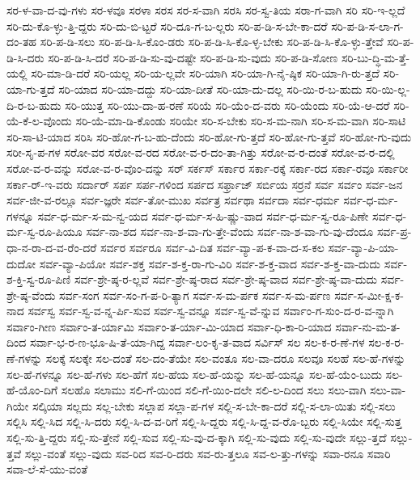 {ಸರ-ಳ-ವಾ-ದ-ವು-ಗಳು
ಸರ-ಳವೂ
ಸರಳಾ
ಸರಸ
ಸರ-ಸ-ವಾಗಿ
ಸರಸಿ
ಸರ-ಸ್ವ-ತಿಯ
ಸರಾ-ಗ-ವಾಗಿ
ಸರಿ
ಸರಿ-ಇ-ಲ್ಲದೆ
ಸರಿ-ದು-ಕೊ-ಳ್ಳು-ತ್ತಿ-ದ್ದರು
ಸರಿ-ದು-ಬಿ-ಟ್ಟರೆ
ಸರಿ-ದೂ-ಗ-ಬ-ಲ್ಲರು
ಸರಿ-ಪ-ಡಿ-ಸ-ಬೇ-ಕಾ-ದರೆ
ಸರಿ-ಪ-ಡಿ-ಸ-ಲಾ-ಗ-ದಂ-ತಹ
ಸರಿ-ಪ-ಡಿ-ಸಲು
ಸರಿ-ಪ-ಡಿ-ಸಿ-ಕೊಂ-ಡರು
ಸರಿ-ಪ-ಡಿ-ಸಿ-ಕೊ-ಳ್ಳ-ಬೇಕು
ಸರಿ-ಪ-ಡಿ-ಸಿ-ಕೊ-ಳ್ಳು-ತ್ತೇವೆ
ಸರಿ-ಪ-ಡಿ-ಸಿ-ದರು
ಸರಿ-ಪ-ಡಿ-ಸಿ-ದರೆ
ಸರಿ-ಪ-ಡಿ-ಸು-ವು-ದಷ್ಟೇ
ಸರಿ-ಪ-ಡಿ-ಸು-ವುದು
ಸರಿ-ಪ-ಡಿ-ಸೋಣ
ಸರಿ-ಬು-ದ್ಧಿ-ಮ-ತ್ತೆ-ಯಲ್ಲಿ
ಸರಿ-ಮಾ-ಡಿ-ದರೆ
ಸರಿ-ಯಲ್ಲ
ಸರಿ-ಯ-ಲ್ಲವೇ
ಸರಿ-ಯಾಗಿ
ಸರಿ-ಯಾ-ಗಿ-ನೈ-ಷ್ಠಿಕ
ಸರಿ-ಯಾ-ಗಿ-ರು-ತ್ತದೆ
ಸರಿ-ಯಾ-ಗು-ತ್ತದೆ
ಸರಿ-ಯಾದ
ಸರಿ-ಯಾ-ದದ್ದು
ಸರಿ-ಯಾ-ದೀತೆ
ಸರಿ-ಯಾ-ದು-ದಲ್ಲ
ಸರಿ-ಯಿ-ರ-ಬ-ಹುದು
ಸರಿ-ಯಿ-ಲ್ಲ-ದಿ-ರ-ಬ-ಹುದು
ಸರಿ-ಯುತ್ತ
ಸರಿ-ಯು-ದಾ-ಹ-ರಣೆ
ಸರಿಯೆ
ಸರಿ-ಯೆಂ-ದ-ವರು
ಸರಿ-ಯೆಂದು
ಸರಿ-ಯೆ-ಆ-ದರೆ
ಸರಿ-ಯೆ-ಕೆ-ಲ-ವೊಂದು
ಸರಿ-ಯೆ-ಮಾ-ಡಿ-ಕೊಂಡು
ಸರಿಯೇ
ಸರಿ-ಸ-ಬೇಕು
ಸರಿ-ಸ-ಮ-ನಾಗಿ
ಸರಿ-ಸ-ಮ-ವಾಗಿ
ಸರಿ-ಸಾಟಿ
ಸರಿ-ಸಾ-ಟಿ-ಯಾದ
ಸರಿಸಿ
ಸರಿ-ಹೋ-ಗ-ಬ-ಹು-ದೆಂದು
ಸರಿ-ಹೋ-ಗು-ತ್ತದೆ
ಸರಿ-ಹೋ-ಗು-ತ್ತವೆ
ಸರಿ-ಹೋ-ಗು-ವುದು
ಸರೀ-ಸೃ-ಪ-ಗಳ
ಸರೋ-ವರ
ಸರೋ-ವ-ರದ
ಸರೋ-ವ-ರ-ದಂ-ತಾ-ಗಿತ್ತು
ಸರೋ-ವ-ರ-ದಂತೆ
ಸರೋ-ವ-ರ-ದಲ್ಲಿ
ಸರೋ-ವ-ರ-ವನ್ನು
ಸರೋ-ವ-ರ-ವೊಂ-ದನ್ನು
ಸರ್
ಸರ್ಕಸ್
ಸರ್ಕಾರ
ಸರ್ಕಾ-ರಕ್ಕೆ
ಸರ್ಕಾ-ರದ
ಸರ್ಕಾ-ರವೂ
ಸರ್ಕಾರೀ
ಸರ್ಕಾ-ರ್-ಇ-ವರು
ಸರ್ದಾರ್
ಸರ್ಪ
ಸರ್ಪ-ಗಳಿಂದ
ಸರ್ಪದ
ಸರ್ಫ್ರಾಜ್
ಸರ್ಬಿಯ
ಸರ್ರನೆ
ಸರ್ವ
ಸರ್ವಂ
ಸರ್ವ-ಜನ
ಸರ್ವ-ಜೀ-ವ-ರಲ್ಲೂ
ಸರ್ವ-ಜ್ಞರೇ
ಸರ್ವ-ತೋ-ಮುಖ
ಸರ್ವತ್ರ
ಸರ್ವಥಾ
ಸರ್ವದಾ
ಸರ್ವ-ಧರ್ಮ
ಸರ್ವ-ಧ-ರ್ಮ-ಗಳನ್ನೂ
ಸರ್ವ-ಧ-ರ್ಮ-ಸ-ಮ-ನ್ವ-ಯದ
ಸರ್ವ-ಧ-ರ್ಮ-ಸ-ಹಿ-ಷ್ಣು-ವಾದ
ಸರ್ವ-ಧ-ರ್ಮ-ಸ್ವ-ರೂ-ಪಿಣೇ
ಸರ್ವ-ಧ-ರ್ಮ-ಸ್ವ-ರೂ-ಪಿಯೂ
ಸರ್ವ-ನಾ-ಶದ
ಸರ್ವ-ನಾ-ಶ-ವಾ-ಗು-ತ್ತೇ-ವೆಂದು
ಸರ್ವ-ನಾ-ಶ-ವಾ-ಗು-ವು-ದೆಂದೂ
ಸರ್ವ-ಪ್ರ-ಧಾ-ನ-ರಾ-ದ-ವ-ರೆಂ-ದರೆ
ಸರ್ವರ
ಸರ್ವರೂ
ಸರ್ವ-ವಿ-ದಿತ
ಸರ್ವ-ವ್ಯಾ-ಪ-ಕ-ವಾ-ದ-ಸ-ಕಲ
ಸರ್ವ-ವ್ಯಾ-ಪಿ-ಯಾ-ದುದೋ
ಸರ್ವ-ವ್ಯಾ-ಪಿಯೋ
ಸರ್ವ-ಶಕ್ತ
ಸರ್ವ-ಶ-ಕ್ತ-ರಾ-ಗು-ವಿರಿ
ಸರ್ವ-ಶ-ಕ್ತ-ವಾದ
ಸರ್ವ-ಶ-ಕ್ತ-ವಾ-ದುದು
ಸರ್ವ-ಶ-ಕ್ತಿ-ಸ್ವ-ರೂ-ಪಿಣಿ
ಸರ್ವ-ಶ್ರೇ-ಷ್ಠ-ರ-ಲ್ಲವೆ
ಸರ್ವ-ಶ್ರೇ-ಷ್ಠ-ರಾದ
ಸರ್ವ-ಶ್ರೇ-ಷ್ಠ-ವಾದ
ಸರ್ವ-ಶ್ರೇ-ಷ್ಠ-ವಾ-ದುದು
ಸರ್ವ-ಶ್ರೇ-ಷ್ಠ-ವೆಂದು
ಸರ್ವ-ಸಂಗ
ಸರ್ವ-ಸಂ-ಗ-ಪ-ರಿ-ತ್ಯಾಗ
ಸರ್ವ-ಸ-ಮ-ರ್ಪಕ
ಸರ್ವ-ಸ-ಮ-ರ್ಪಣ
ಸರ್ವ-ಸ-ಮೀ-ಕ್ಷ-ಕ-ನಾದ
ಸರ್ವಸ್ವ
ಸರ್ವ-ಸ್ವ-ವ-ನ್ನ-ರ್ಪಿ-ಸುವ
ಸರ್ವ-ಸ್ವ-ವನ್ನೂ
ಸರ್ವ-ಸ್ವ-ವೆ-ನ್ನುವ
ಸರ್ವಾಂ-ಗ-ಸುಂ-ದ-ರ-ವ-ನ್ನಾಗಿ
ಸರ್ವಾಂ-ಗೀಣ
ಸರ್ವಾಂ-ತ-ರ್ಯಾಮಿ
ಸರ್ವಾಂ-ತ-ರ್ಯಾ-ಮಿ-ಯಾದ
ಸರ್ವಾ-ಧಿ-ಕಾ-ರಿ-ಯಾದ
ಸರ್ವಾ-ನು-ಮ-ತ-ದಿಂದ
ಸರ್ವಾ-ಭ-ರ-ಣ-ಭೂ-ಷಿ-ತೆ-ಯಾ-ಗಿದ್ದ
ಸರ್ವಾ-ಲಂ-ಕೃ-ತ-ವಾದ
ಸರ್ವಿಸ್
ಸಲ
ಸಲ-ಕ-ರ-ಣೆ-ಗಳ
ಸಲ-ಕ-ರ-ಣೆ-ಗಳನ್ನು
ಸಲಕ್ಕೆ
ಸಲಕ್ಕೇ
ಸಲ-ದಂತೆ
ಸಲ-ದಂ-ತೆಯೇ
ಸಲ-ವಂತೂ
ಸಲ-ವಾ-ದರೂ
ಸಲವೂ
ಸಲಹೆ
ಸಲ-ಹೆ-ಗಳನ್ನು
ಸಲ-ಹೆ-ಗಳನ್ನೂ
ಸಲ-ಹೆ-ಗಳು
ಸಲ-ಹೆಗೆ
ಸಲ-ಹೆಯ
ಸಲ-ಹೆ-ಯನ್ನು
ಸಲ-ಹೆ-ಯನ್ನೂ
ಸಲ-ಹೆ-ಯೆಂ-ಬುದು
ಸಲ-ಹೆ-ಯೊಂ-ದಿಗೆ
ಸಲಹೊ
ಸಲಾಮು
ಸಲಿ-ಗೆ-ಯಿಂದ
ಸಲಿ-ಗೆ-ಯಿಂ-ದಲೇ
ಸಲಿ-ಲ-ದಿಂದ
ಸಲು
ಸಲು-ವಾಗಿ
ಸಲು-ವಾ-ಗಿಯೇ
ಸಲ್ಕಿಯಾ
ಸಲ್ಲದು
ಸಲ್ಲ-ಬೇಕು
ಸಲ್ಲಾಪ
ಸಲ್ಲಾ-ಪ-ಗಳ
ಸಲ್ಲಿ-ಸ-ಬೇ-ಕಾ-ದರೆ
ಸಲ್ಲಿ-ಸ-ಲಾ-ಯಿತು
ಸಲ್ಲಿ-ಸಲು
ಸಲ್ಲಿಸಿ
ಸಲ್ಲಿ-ಸಿದ
ಸಲ್ಲಿ-ಸಿ-ದರು
ಸಲ್ಲಿ-ಸಿ-ದ-ವ-ರಿಗೆ
ಸಲ್ಲಿ-ಸಿ-ದ್ದರು
ಸಲ್ಲಿ-ಸಿ-ದ್ದ-ವ-ರೊ-ಬ್ಬರು
ಸಲ್ಲಿ-ಸಿಯೇ
ಸಲ್ಲಿ-ಸುತ್ತ
ಸಲ್ಲಿ-ಸು-ತ್ತಿ-ದ್ದರು
ಸಲ್ಲಿ-ಸು-ತ್ತೇನೆ
ಸಲ್ಲಿ-ಸುವ
ಸಲ್ಲಿ-ಸು-ವು-ದ-ಕ್ಕಾಗಿ
ಸಲ್ಲಿ-ಸು-ವುದು
ಸಲ್ಲಿ-ಸು-ವುದೇ
ಸಲ್ಲು-ತ್ತದೆ
ಸಲ್ಲು-ತ್ತವೆ
ಸಲ್ಲು-ವಂತೆ
ಸಲ್ಲು-ವುದು
ಸವ-ರಿದ
ಸವ-ರಿ-ದರು
ಸವ-ರು-ತ್ತಲೂ
ಸವ-ಲ-ತ್ತು-ಗಳನ್ನು
ಸವಾ-ರನೂ
ಸವಾರಿ
ಸವಾ-ಲೆ-ಸೆ-ಯು-ವಂತೆ
}
